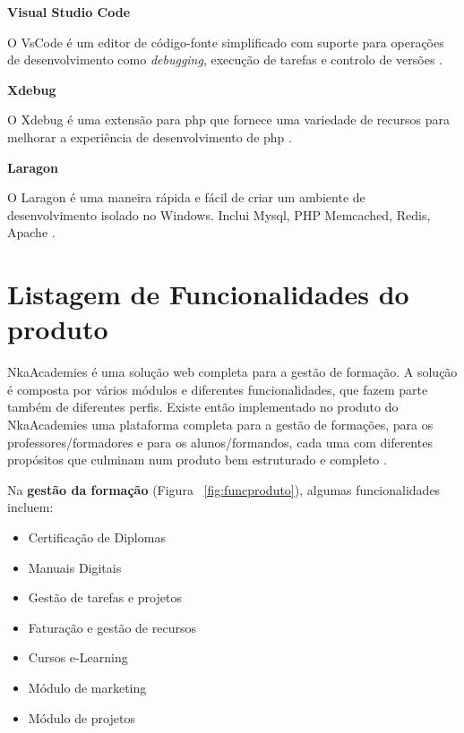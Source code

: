 \textbf{Visual Studio Code}

O VsCode é um editor de código-fonte simplificado com suporte para operações de desenvolvimento como \textit{debugging}, execução de tarefas e controlo de versões \citep{vscode}.\newline %

\quad \textbf{Xdebug}

\quad O Xdebug é uma extensão para \acrshort{php} que fornece uma variedade de recursos para melhorar a experiência de desenvolvimento de \acrshort{php} \citep{xdebug}.\newline


\textbf{Laragon}

O Laragon é uma maneira rápida e fácil de criar um ambiente de desenvolvimento isolado no Windows. Inclui Mysql, PHP Memcached, Redis, Apache \citep{laragon}.\newline

\section{Listagem de Funcionalidades do produto}

NkaAcademies é uma solução web completa para a gestão de formação.
A solução é composta por vários módulos e diferentes funcionalidades, que fazem parte também de diferentes perfis. Existe então implementado no produto do NkaAcademies uma plataforma completa para a gestão de formações, para os professores/formadores e para os alunos/formandos, cada uma com diferentes propósitos que culminam num produto bem estruturado e completo \citep{nka1}.

Na \textbf{gestão da formação} (Figura ~\ref{fig:funcproduto}), algumas funcionalidades incluem:
\begin{itemize}
  \setlength\itemsep{-0.5em}
  \item Certificação de Diplomas
  \item Manuais Digitais
  \item Gestão de tarefas e projetos
  \item Faturação e gestão de recursos
  \item Cursos e-Learning
  \item Módulo de marketing
  \item Módulo de projetos
\end{itemize}

